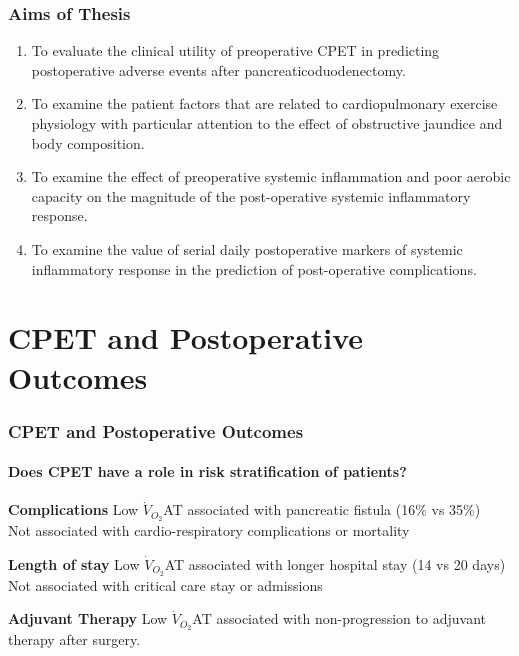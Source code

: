 \documentclass[10pt]{beamer}
\begin{document}
\begin{frame}
	\frametitle{Aims of Thesis}
	\begin{enumerate}
		\item To evaluate the clinical utility of preoperative CPET in predicting postoperative adverse events after pancreaticoduodenectomy.
		\item To examine the patient factors that are related to cardiopulmonary exercise physiology with particular attention to the effect of obstructive jaundice and body composition.
		\item To examine the effect of preoperative systemic inflammation and poor aerobic capacity on the magnitude of the post-operative systemic inflammatory response.
		\item To examine the value of serial daily postoperative markers of systemic inflammatory response in the prediction of post-operative complications.
	\end{enumerate}
\end{frame}



\section[Chapter 2]{CPET and Postoperative Outcomes}
\begin{frame}
	\frametitle{CPET and Postoperative Outcomes}
	\framesubtitle{Does CPET have a role in risk stratification of patients?}
	\begin{block}{\textbf{Complications}}
		Low $\dot{V}_{O_2}$AT associated with pancreatic fistula (16\% vs 35\%) \\
		Not associated with cardio-respiratory complications or mortality
	\end{block}
	
	\begin{block}{\textbf{Length of stay}}
		Low $\dot{V}_{O_2}$AT associated with longer hospital stay (14 vs 20 days)\\
		Not associated with critical care stay or admissions
	\end{block}
	
	\begin{block}{\textbf{Adjuvant Therapy}}
		Low $\dot{V}_{O_2}$AT associated with non-progression to adjuvant therapy after surgery.
	\end{block}
\end{frame}
\end{document}
